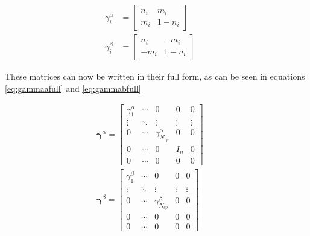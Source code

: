 \begin{subequations}
  \begin{align}
    \label{eq:gammaa}
    \gamma^\alpha_i & = \begin{bmatrix}
      n_i & m_i    \\
      m_i & 1- n_i
    \end{bmatrix}  &  & \\
    \label{eq:gammab}
    \gamma^\beta_i  & = \begin{bmatrix}
      n_i  & -m_i  \\
      -m_i & 1-n_i
    \end{bmatrix} &  &
  \end{align}
\end{subequations}

These matrices can now be written in their full form, as can be seen in equations \eqref{eq:gammaafull} and \eqref{eq:gammabfull}

\begin{subequations}
  \begin{align}
    \label{eq:gammaafull}
    \mathbf{\gamma}^\alpha = \begin{bmatrix}
      \gamma^\alpha_1 & \cdots & 0                      & 0      & 0      \\
      \vdots          & \ddots & \vdots                 & \vdots & \vdots \\
      0               & \cdots & \gamma^\alpha_{N_{cp}} & 0      & 0      \\
      0               & \cdots & 0                      & I_n    & 0      \\
      0               & \cdots & 0                      & 0      & 0
    \end{bmatrix} &  & \\
    \label{eq:gammabfull}
    \mathbf{\gamma}^\beta = \begin{bmatrix}
      \gamma^\beta_1 & \cdots & 0                     & 0      & 0      \\
      \vdots         & \ddots & \vdots                & \vdots & \vdots \\
      0              & \cdots & \gamma^\beta_{N_{cp}} & 0      & 0      \\
      0              & \cdots & 0                     & 0      & 0      \\
      0              & \cdots & 0                     & 0      & 0
    \end{bmatrix}  &  &
  \end{align}
\end{subequations}

